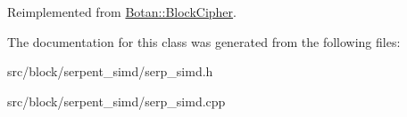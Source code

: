 Reimplemented from \hyperlink{classBotan_1_1BlockCipher_a635a1c3ed1084be78cf1b9e655ab1465}{Botan\-::\-Block\-Cipher}.



The documentation for this class was generated from the following files\-:\begin{DoxyCompactItemize}
\item 
src/block/serpent\-\_\-simd/serp\-\_\-simd.\-h\item 
src/block/serpent\-\_\-simd/serp\-\_\-simd.\-cpp\end{DoxyCompactItemize}
